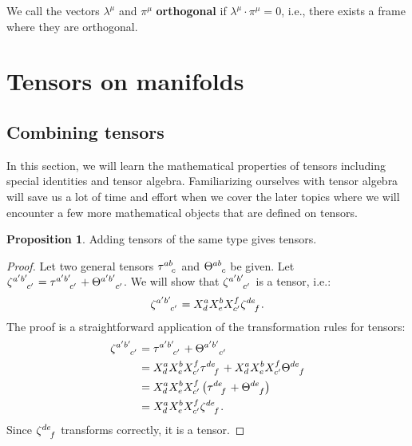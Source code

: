 \documentclass{book}
\theoremstyle{definition}
\newtheorem{prop}{Proposition}[section]
\begin{document}
We call the vectors $\lambda^\mu$ and $\pi^\mu$ \textbf{orthogonal} if $\lambda^\mu\cdot\pi^\mu = 0$, i.e., there exists a frame where they are orthogonal.


\section{Tensors on manifolds}
\subsection{Combining tensors}
In this section, we will learn the mathematical properties of tensors including special identities and tensor algebra. Familiarizing ourselves with tensor algebra will save us a lot of time and effort when we cover the later topics where we will encounter a few more mathematical objects that are defined on tensors. \\

\begin{prop}
	Adding tensors of the same type gives tensors.
\end{prop}
\begin{proof}
	Let two general tensors $\tensor{\tau}{^{ab}_c}$ and $\tensor{\Theta}{^{ab}_c}$ be given. Let $\tensor{\zeta}{^{a'b'}_{c'}} = \tensor{\tau}{^{a'b'}_{c'}} + \tensor{\Theta}{^{a'b'}_{c'}}$. We will show that $\tensor{\zeta}{^{a'b'}_{c'}}$ is a tensor, i.e.:
	\begin{align*}
	\tensor{\zeta}{^{a'b'}_{c'}} = X^{a}_dX^{b}_eX^f_{c'}\tensor{\zeta}{^{de}_f}.
	\end{align*}
	The proof is a straightforward application of the transformation rules for tensors:
	\begin{align*}
	\tensor{\zeta}{^{a'b'}_{c'}} &= \tensor{\tau}{^{a'b'}_{c'}} + \tensor{\Theta}{^{a'b'}_{c'}} \\
	&= X^{a}_dX^{b}_eX^f_{c'}\tensor{\tau}{^{de}_{f}} + X^{a}_dX^{b}_eX^f_{c'}\tensor{\Theta}{^{de}_{f}}\\
	&= X^{a}_dX^{b}_eX^f_{c'}\left(\tensor{\tau}{^{de}_{f}} +  \tensor{\Theta}{^{de}_{f}}\right) \\
	&= X^{a}_dX^{b}_eX^f_{c'}\tensor{\zeta}{^{de}_{f}}.
	\end{align*}
	Since $\tensor{\zeta}{^{de}_{f}}$ transforms correctly, it is a tensor.
\end{proof}
\end{document}
